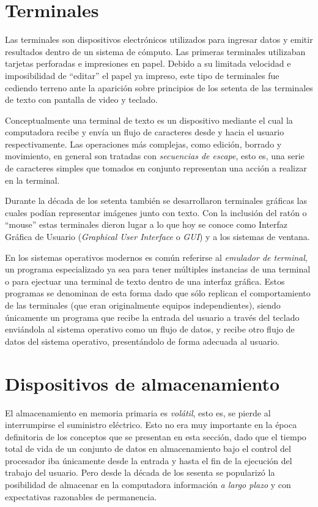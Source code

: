 \documentclass[11pt,fleqn]{book} %
\begin{document}
\section{Terminales}
\label{sec-2-3}

Las terminales son dispositivos electrónicos utilizados para ingresar datos
y emitir resultados dentro de un sistema de cómputo. 
Las primeras terminales utilizaban tarjetas
perforadas e impresiones en papel. Debido a su limitada velocidad e
imposibilidad de ``editar'' el papel ya impreso, este tipo de terminales
fue cediendo terreno ante la aparición sobre principios de los setenta 
de las terminales de texto con pantalla de video y teclado.

Conceptualmente una terminal de texto es un dispositivo mediante el cual
la computadora recibe y envía un flujo de caracteres desde y hacia el usuario respectivamente.
Las operaciones más complejas, como edición, borrado y movimiento,
en general son tratadas con \emph{secuencias de escape}, esto es, una serie
de caracteres simples que tomados en conjunto representan una acción
a realizar en la terminal. 

Durante la década de los setenta también se desarrollaron terminales 
gráficas las cuales podían representar imágenes junto 
con texto. Con la inclusión del ratón o ``mouse''
estas terminales dieron lugar a lo que hoy se conoce
como Interfaz Gráfica de Usuario (\emph{Graphical User Interface} o \emph{GUI})
y a los sistemas de ventana.

En los sistemas operativos modernos es común referirse al \emph{emulador de terminal}, un programa especializado ya sea para tener múltiples
instancias de una terminal o para ejectuar una terminal de texto dentro de una
interfaz gráfica. Estos programas se denominan de esta forma dado que
sólo replican el comportamiento de las terminales (que eran
originalmente equipos independientes), siendo únicamente un programa
que recibe la entrada del usuario a través del teclado enviándola al
sistema operativo como un flujo de datos, y recibe otro flujo de datos
del sistema operativo, presentándolo de forma adecuada al
usuario.
\section{Dispositivos de almacenamiento}
\label{sec-2-4}


El almacenamiento en memoria primaria es \emph{volátil}, esto es, se pierde
al interrumpirse el suministro eléctrico. Esto no era muy importante
en la época definitoria de los conceptos que se presentan en esta sección,
dado que el tiempo total de vida de un conjunto de datos en
almacenamiento bajo el control del procesador iba únicamente desde la
entrada y hasta el fin de la ejecución del trabajo del usuario. Pero
desde la década de los sesenta se popularizó la posibilidad de
almacenar en la computadora información \emph{a largo plazo} y con
expectativas razonables de permanencia.
\end{document}
